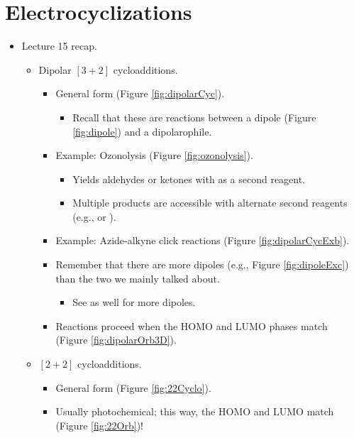\documentclass[../notes.tex]{subfiles}
\begin{document}
\section{Electrocyclizations}
\begin{itemize}
    \item {}Lecture 15 recap.
    \begin{itemize}
        \item Dipolar $[3+2]$ cycloadditions.
        \begin{itemize}
            \item General form (Figure \ref{fig:dipolarCyc}).
            \begin{itemize}
                \item Recall that these are reactions between a dipole (Figure \ref{fig:dipole}) and a dipolarophile.
            \end{itemize}
            \item Example: Ozonolysis (Figure \ref{fig:ozonolysis}).
            \begin{itemize}
                \item Yields aldehydes or ketones with  as a second reagent.
                \item Multiple products are accessible with alternate second reagents (e.g.,  or ).
            \end{itemize}
            \item Example: Azide-alkyne click reactions (Figure \ref{fig:dipolarCycExb}).
            \item Remember that there are more dipoles (e.g., Figure \ref{fig:dipoleExc}) than the two we mainly talked about.
            \begin{itemize}
                \item See \textcite{bib:Clayden} as well for more dipoles.
            \end{itemize}
            \item Reactions proceed when the HOMO and LUMO phases match (Figure \ref{fig:dipolarOrb3D}).
        \end{itemize}
        \item $[2+2]$ cycloadditions.
        \begin{itemize}
            \item General form (Figure \ref{fig:22Cyclo}).
            \item Usually photochemical; this way, the HOMO and LUMO match (Figure \ref{fig:22Orb})!

\end{itemize}
\end{itemize}
\end{itemize}
\end{document}
